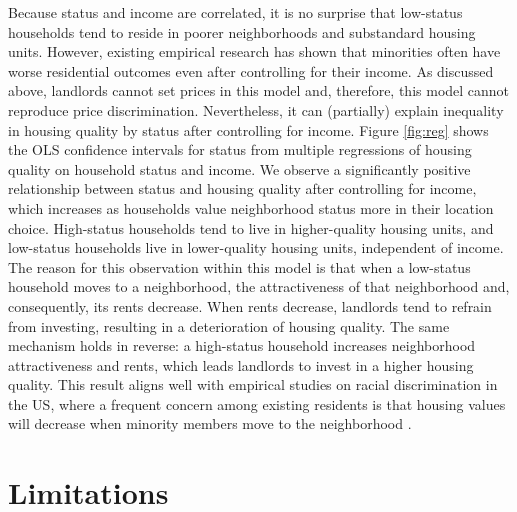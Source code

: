 \documentclass[a4paper,12pt]{article}
\begin{document}
Because status and income are correlated, it is no surprise that low-status households tend to reside in poorer neighborhoods and substandard housing units. However, existing empirical research has shown that minorities often have worse residential outcomes even after controlling for their income. As discussed above, landlords cannot set prices in this model and, therefore, this model cannot reproduce price discrimination. Nevertheless, it can (partially) explain inequality in housing quality by status after controlling for income. Figure \ref{fig:reg} shows the OLS confidence intervals for status from multiple regressions of housing quality on household status and income. We observe a significantly positive relationship between status and housing quality after controlling for income, which increases as households value neighborhood status more in their location choice. High-status households tend to live in higher-quality housing units, and low-status households live in lower-quality housing units, independent of income. The reason for this observation within this model is that when a low-status household moves to a neighborhood, the attractiveness of that neighborhood and, consequently, its rents decrease. When rents decrease, landlords tend to refrain from investing, resulting in a deterioration of housing quality. The same mechanism holds in reverse: a high-status household increases neighborhood attractiveness and rents, which leads landlords to invest in a higher housing quality. This result aligns well with empirical studies on racial discrimination in the US, where a frequent concern among existing residents is that housing values will decrease when minority members move to the neighborhood \citep{harrisPropertyValuesDrop1999, krysanDoesRaceMatter2009}.


\section{Limitations}
\end{document}
